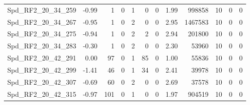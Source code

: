 \begin{longtable}[c]{@{}lrrrrrrrrrrr@{}}
Spd\_RF2\_20\_34\_259        & -0.99                  & 1                       & 0                       & 1                      & 0                       & 0                       & 1.99                    & 998858                   & 10                       & 0                        & 0                        \\
Spd\_RF2\_20\_34\_267        & -0.95                  & 1                       & 0                       & 2                      & 0                       & 0                       & 2.95                    & 1467583                  & 10                       & 0                        & 0                        \\
Spd\_RF2\_20\_34\_275        & -0.94                  & 1                       & 0                       & 2                      & 2                       & 0                       & 2.94                    & 201800                   & 10                       & 0                        & 0                        \\
Spd\_RF2\_20\_34\_283        & -0.30                  & 1                       & 0                       & 2                      & 0                       & 0                       & 2.30                    & 53960                    & 10                       & 0                        & 0                        \\
Spd\_RF2\_20\_42\_291        & 0.00                   & 97                      & 0                       & 1                      & 85                      & 0                       & 1.00                    & 55836                    & 10                       & 0                        & 0                        \\
Spd\_RF2\_20\_42\_299        & -1.41                  & 46                      & 0                       & 1                      & 34                      & 0                       & 2.41                    & 39978                    & 10                       & 0                        & 0                        \\
Spd\_RF2\_20\_42\_307        & -0.69                  & 60                      & 0                       & 2                      & 0                       & 0                       & 2.69                    & 37578                    & 10                       & 0                        & 0                        \\
Spd\_RF2\_20\_42\_315        & -0.97                  & 101                     & 0                       & 1                      & 0                       & 0                       & 1.97                    & 904519                   & 10                       & 0                        & 0                        \\

\end{longtable}
